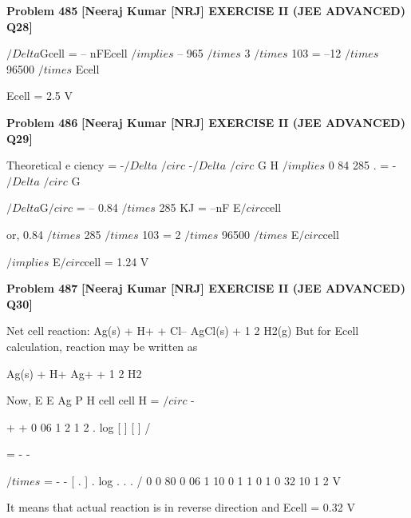 \begin{problembox}
\textbf{Problem 485} \hfill \textbf{[Neeraj Kumar [NRJ] EXERCISE II (JEE ADVANCED) Q28]}
\label{q:ext-nrj_all_questions-485}

$/Delta$Gcell = -- nFEcell $/implies$ -- 965 $/times$ 3 $/times$ 103 =  --12 $/times$ 96500 
$/times$ Ecell
 
   Ecell = 2.5 V
\end{problembox}

\begin{problembox}
\textbf{Problem 486} \hfill \textbf{[Neeraj Kumar [NRJ] EXERCISE II (JEE ADVANCED) Q29]}
\label{q:ext-nrj_all_questions-486}

Theoretical e   ciency = -$/Delta$
$/circ$
-$/Delta$
$/circ$
G
H $/implies$ 0 84
285
.
= -$/Delta$
$/circ$
G
 
   $/Delta$G$/circ$ = -- 0.84 $/times$ 285 KJ = --nF   E$/circ$cell
 
 or, 0.84 $/times$ 285 $/times$ 103 = 2 $/times$ 96500 $/times$ E$/circ$cell
 
 
 $/implies$ E$/circ$cell = 1.24 V
\end{problembox}

\begin{problembox}
\textbf{Problem 487} \hfill \textbf{[Neeraj Kumar [NRJ] EXERCISE II (JEE ADVANCED) Q30]}
\label{q:ext-nrj_all_questions-487}

Net cell reaction: Ag(s) + H+ + Cl--   AgCl(s) + 
1
2 H2(g) But for Ecell calculation, reaction may be 
written as
 
 Ag(s) + H+   Ag+ + 1
2 H2
 
 Now, E
E
Ag
P
H
cell
cell
H
=
$/circ$
-
 
 
+
+
0 06
1
2
1 2
.
log
[
]
[
]
/
 
 
=
-
-
 
 
  
 
  $/times$
= -
-
[
.
]
.
log
.
.
.
/
0
0 80
0 06
1
10
0 1
1
0 1
0 32
10
1 2
V
 
 It means that actual reaction is in reverse direction 
and Ecell = 0.32 V
\end{problembox}

